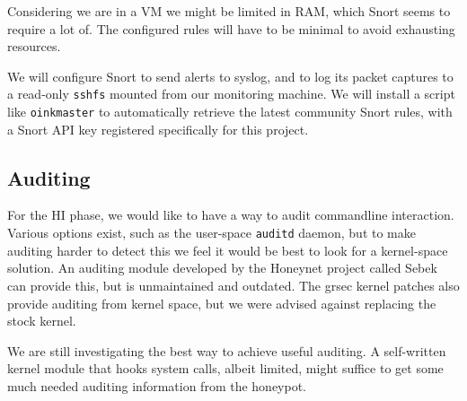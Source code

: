 \documentclass[11pt]{article} %
\begin{document}
Considering we are in a VM we might be limited in RAM, which Snort seems to require a lot of.
The configured rules will have to be minimal to avoid exhausting resources.

We will configure Snort to send alerts to syslog, and to log its packet captures to a read-only \verb|sshfs| mounted from our monitoring machine.
We will install a script like \verb|oinkmaster| to automatically retrieve the latest community Snort rules, with a Snort API key registered specifically for this project.

\subsection{Auditing}
For the HI phase, we would like to have a way to audit commandline interaction. 
Various options exist, such as the user-space \verb|auditd| daemon, but to make auditing harder to detect this we feel it would be best to look for a kernel-space solution.
An auditing module developed by the Honeynet project called Sebek can provide this, but is unmaintained and outdated.
The grsec kernel patches also provide auditing from kernel space, but we were advised against replacing the stock kernel.

We are still investigating the best way to achieve useful auditing.
A self-written kernel module that hooks system calls, albeit limited, might suffice to get some much needed auditing information from the honeypot.




\end{document}
